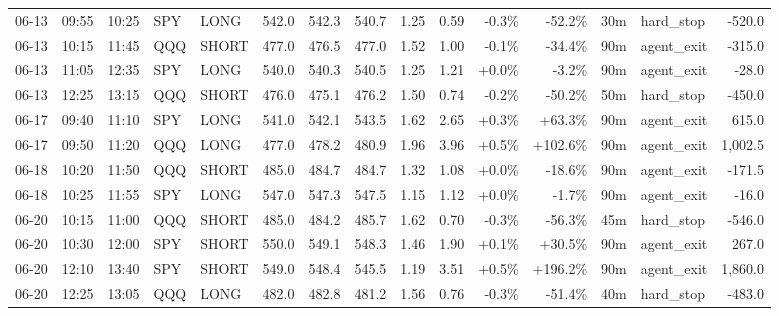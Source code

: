 \documentclass[11pt,a4paper,twoside]{article}
\begin{document}
\begin{landscape}
\begin{center}
\begin{longtable}{>{\color{txtmain}}l l l l l r r r r r r r r >{\color{txtmain}}l r}
06-13 & 09:55 & 10:25 & SPY & LONG & 542.0 & 542.3 & 540.7 & 1.25 & 0.59 & \textcolor{lossred}{-0.3\%} & \textcolor{lossred}{-52.2\%} & 30m & hard\_stop & \textcolor{lossred}{-520.0} \\
06-13 & 10:15 & 11:45 & QQQ & SHORT & 477.0 & 476.5 & 477.0 & 1.52 & 1.00 & \textcolor{lossred}{-0.1\%} & \textcolor{lossred}{-34.4\%} & 90m & agent\_exit & \textcolor{lossred}{-315.0} \\
06-13 & 11:05 & 12:35 & SPY & LONG & 540.0 & 540.3 & 540.5 & 1.25 & 1.21 & \textcolor{wingreen}{+0.0\%} & \textcolor{lossred}{-3.2\%} & 90m & agent\_exit & \textcolor{lossred}{-28.0} \\
06-13 & 12:25 & 13:15 & QQQ & SHORT & 476.0 & 475.1 & 476.2 & 1.50 & 0.74 & \textcolor{lossred}{-0.2\%} & \textcolor{lossred}{-50.2\%} & 50m & hard\_stop & \textcolor{lossred}{-450.0} \\
06-17 & 09:40 & 11:10 & SPY & LONG & 541.0 & 542.1 & 543.5 & 1.62 & 2.65 & \textcolor{wingreen}{+0.3\%} & \textcolor{wingreen}{+63.3\%} & 90m & agent\_exit & \textcolor{wingreen}{615.0} \\
06-17 & 09:50 & 11:20 & QQQ & LONG & 477.0 & 478.2 & 480.9 & 1.96 & 3.96 & \textcolor{wingreen}{+0.5\%} & \textcolor{wingreen}{+102.6\%} & 90m & agent\_exit & \textcolor{wingreen}{1,002.5} \\
06-18 & 10:20 & 11:50 & QQQ & SHORT & 485.0 & 484.7 & 484.7 & 1.32 & 1.08 & \textcolor{wingreen}{+0.0\%} & \textcolor{lossred}{-18.6\%} & 90m & agent\_exit & \textcolor{lossred}{-171.5} \\
06-18 & 10:25 & 11:55 & SPY & LONG & 547.0 & 547.3 & 547.5 & 1.15 & 1.12 & \textcolor{wingreen}{+0.0\%} & \textcolor{lossred}{-1.7\%} & 90m & agent\_exit & \textcolor{lossred}{-16.0} \\
06-20 & 10:15 & 11:00 & QQQ & SHORT & 485.0 & 484.2 & 485.7 & 1.62 & 0.70 & \textcolor{lossred}{-0.3\%} & \textcolor{lossred}{-56.3\%} & 45m & hard\_stop & \textcolor{lossred}{-546.0} \\
06-20 & 10:30 & 12:00 & SPY & SHORT & 550.0 & 549.1 & 548.3 & 1.46 & 1.90 & \textcolor{wingreen}{+0.1\%} & \textcolor{wingreen}{+30.5\%} & 90m & agent\_exit & \textcolor{wingreen}{267.0} \\
06-20 & 12:10 & 13:40 & SPY & SHORT & 549.0 & 548.4 & 545.5 & 1.19 & 3.51 & \textcolor{wingreen}{+0.5\%} & \textcolor{wingreen}{+196.2\%} & 90m & agent\_exit & \textcolor{wingreen}{1,860.0} \\
06-20 & 12:25 & 13:05 & QQQ & LONG & 482.0 & 482.8 & 481.2 & 1.56 & 0.76 & \textcolor{lossred}{-0.3\%} & \textcolor{lossred}{-51.4\%} & 40m & hard\_stop & \textcolor{lossred}{-483.0} \\

\end{longtable}
\end{center}
\end{landscape}
\end{document}
